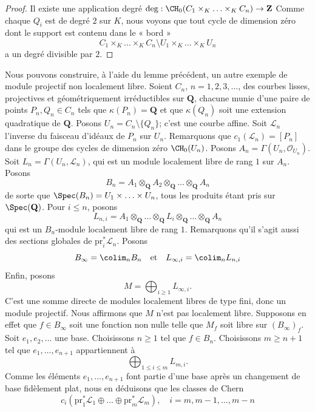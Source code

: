 \begin{proof}
Il existe une application degré
$\deg : \CH_0(C_1 \times_K \ldots \times_K C_n) \to \mathbf{Z}$
Comme chaque $Q_i$ est de degré $2$ sur $K$, nous voyons que
tout cycle de dimension zéro dont le support est contenu dans le « bord »
$$
C_1 \times_K \ldots \times_K C_n
\setminus
U_1 \times_K \ldots \times_K U_n
$$
a un degré divisible par $2$.
\end{proof}

\noindent
Nous pouvons construire, à l'aide du lemme précédent, un autre exemple de
module projectif non localement libre. Soient
$C_n$, $n = 1, 2, 3, \ldots$, des courbes lisses, projectives et géométriquement
irréductibles sur $\mathbf{Q}$, chacune munie d'une paire de points
$P_n, Q_n \in C_n$ tels que $\kappa(P_n) = \mathbf{Q}$ et que
$\kappa(Q_n)$ soit une extension quadratique de $\mathbf{Q}$.
Posons $U_n = C_n \setminus \{Q_n\}$; c'est une courbe affine.
Soit $\mathcal{L}_n$ l'inverse du faisceau d'idéaux de $P_n$
sur $U_n$. Remarquons que $c_1(\mathcal{L}_n) = [P_n]$ dans le groupe des
cycles de dimension zéro $\CH_0(U_n)$. Posons $A_n = \Gamma(U_n, \mathcal{O}_{U_n})$.
Soit $L_n = \Gamma(U_n, \mathcal{L}_n)$, qui est un module localement
libre de rang $1$ sur $A_n$. Posons
$$
B_n = A_1 \otimes_{\mathbf{Q}} A_2 \otimes_{\mathbf{Q}} \ldots
\otimes_{\mathbf{Q}} A_n
$$
de sorte que $\Spec(B_n) = U_1 \times \ldots \times U_n$, tous les produits
étant pris sur $\Spec(\mathbf{Q})$. Pour $i \leq n$, posons
$$
L_{n, i} =
A_1 \otimes_{\mathbf{Q}} \ldots \otimes_{\mathbf{Q}} L_i
\otimes_{\mathbf{Q}} \ldots \otimes_{\mathbf{Q}} A_n
$$
qui est un $B_n$-module localement libre de rang $1$. Remarquons qu'il s'agit
aussi des sections globales de $\text{pr}_i^*\mathcal{L}_n$. Posons
$$
B_\infty = \colim_n B_n
\quad\text{et}\quad
L_{\infty, i} = \colim_n L_{n, i}
$$
Enfin, posons
$$
M = \bigoplus\nolimits_{i \geq 1} L_{\infty, i}.
$$
C'est une somme directe de modules localement libres de type fini, donc un module projectif.
Nous affirmons que $M$ n'est pas localement libre. Supposons en effet que
$f \in B_\infty$ soit une fonction non nulle telle que $M_f$ soit libre
sur $(B_\infty)_f$. Soit $e_1, e_2, \ldots$ une base. Choisissons
$n \geq 1$ tel que $f \in B_n$.
Choisissons $m \geq n + 1$ tel que $e_1, \ldots, e_{n + 1}$ appartiennent à
$$
\bigoplus\nolimits_{1 \leq i \leq m} L_{m, i}.
$$
Comme les éléments $e_1, \ldots, e_{n + 1}$ font partie d'une base
après un changement de base fidèlement plat, nous en déduisons que
les classes de Chern
$$
c_i(\text{pr}_1^*\mathcal{L}_1 \oplus \ldots \oplus
\text{pr}_m^*\mathcal{L}_m), \quad i = m, m - 1, \ldots, m - n
$$
